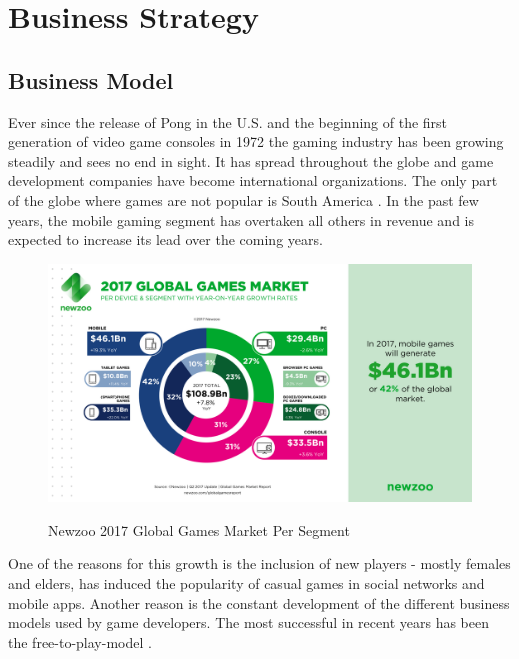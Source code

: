 \documentclass[12p]{article}
\begin{document}

\newpage
\section{Business Strategy} \label{MarketAnalysis}

\subsection{Business Model} 
Ever since the release of Pong \cite{Pong} in the U.S. and the beginning of the first generation of video game consoles in 1972 the gaming industry has been growing steadily and sees no end in sight. It has spread throughout the globe and game development companies have become international organizations. The only part of the globe where games are not popular is South America \cite{GamesMarketRevenue}. In the past few years, the mobile gaming segment has overtaken all others in revenue and is expected to increase its lead over the coming years.

\begin{figure}[ht]
 \center
 \includegraphics[width=1\textwidth]{BusinessStrategy/Newzoo_2017_Global_Games_Market_Per_Segment_April_2017}
 \label{Newzoo_2017_Global_Games_Market_Per_Segment_April_2017}
 \caption{Newzoo 2017 Global Games Market Per Segment \cite{NezooScreenshot}}
\end{figure}

One of the reasons for this growth is the inclusion of new players - mostly females and elders, has induced the popularity of casual games in social networks and mobile apps. Another reason is the constant development of the different business models used by game developers. The most successful in recent years has been the free-to-play-model \cite{BusinessModelsAndStrategy}.
\end{document}
